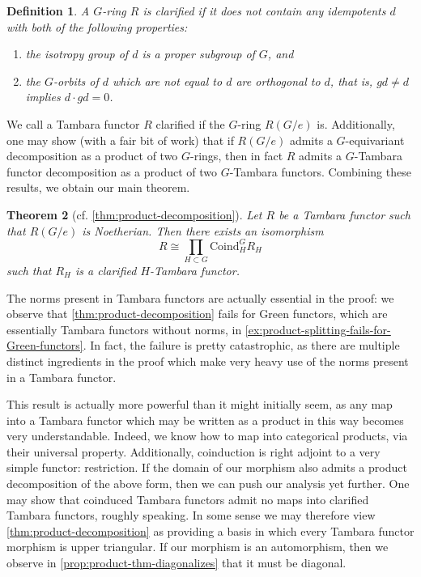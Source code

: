 \documentclass[11pt,dvipsnames]{amsart}
\newtheorem{theoremLET}{Theorem}
\theoremstyle{BoldRemark}
\newtheorem{definitionLET}[theoremLET]{Definition}
\begin{document}
\begin{definitionLET}
	A $G$-ring $R$ is \emph{clarified} if it does not contain any idempotents $d$ with both of the following properties: 
	\begin{enumerate}
		\item the isotropy group of $d$ is a proper subgroup of $G$, and
		\item the $G$-orbits of $d$ which are not equal to $d$ are orthogonal to $d$, that is, $gd \neq d$ implies $d \cdot gd = 0$.
	\end{enumerate}
\end{definitionLET}

We call a Tambara functor $R$ clarified if the $G$-ring $R(G/e)$ is. Additionally, one may show (with a fair bit of work) that if $R(G/e)$ admits a $G$-equivariant decomposition as a product of two $G$-rings, then in fact $R$ admits a $G$-Tambara functor decomposition as a product of two $G$-Tambara functors. Combining these results, we obtain our main theorem.

\begin{theoremLET}[cf. \cref{thm:product-decomposition}]
	Let $R$ be a Tambara functor such that $R(G/e)$ is Noetherian. Then there exists an isomorphism 
    \[ 
        R \cong \prod_{H \subset G} \mathrm{Coind}_H^G R_H 
    \] 
    such that $R_H$ is a clarified $H$-Tambara functor.
\end{theoremLET}

The norms present in Tambara functors are actually essential in the proof: we observe that \cref{thm:product-decomposition} fails for Green functors, which are essentially Tambara functors without norms, in \cref{ex:product-splitting-fails-for-Green-functors}. In fact, the failure is pretty catastrophic, as there are multiple distinct ingredients in the proof which make very heavy use of the norms present in a Tambara functor.

This result is actually more powerful than it might initially seem, as any map into a Tambara functor which may be written as a product in this way becomes very understandable. Indeed, we know how to map into categorical products, via their universal property. Additionally, coinduction is right adjoint to a very simple functor: restriction. If the domain of our morphism also admits a product decomposition of the above form, then we can push our analysis yet further. One may show that coinduced Tambara functors admit no maps into clarified Tambara functors, roughly speaking. In some sense we may therefore view \cref{thm:product-decomposition} as providing a basis in which every Tambara functor morphism is upper triangular. If our morphism is an automorphism, then we observe in \cref{prop:product-thm-diagonalizes} that it must be diagonal.
\end{document}
